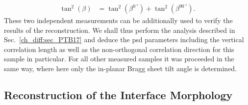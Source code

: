 \begin{align}
 \tan^2(\beta) &= \tan^2(\beta^{\SI{0}{\degree}}) + \tan^2(\beta^{\SI{90}{\degree}}) \text{.} \label{ch_diff:eqn_total_beta}
\end{align}
These two independent measurements can be additionally used to verify the results of the reconstruction. We shall thus perform the analysis described in Sec.~\ref{ch_diff:sec_PTB17} and deduce the \gls{psd} parameters including the vertical correlation length as well as the non-orthogonal correlation direction for this sample in particular. For all other measured samples it was proceeded in the same way, where here only the in-planar Bragg sheet tilt angle is determined.

\subsection{Reconstruction of the Interface Morphology}
